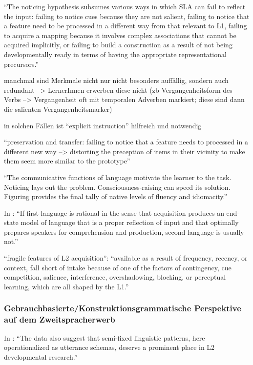         ``The noticing hypothesis subsumes various ways in which SLA can fail to reflect the input: failing to notice cues because they are not salient, failing to notice that a feature need to be processed in a different way from that relevant to L1, failing to acquire a mapping because it involves complex associations that cannot be acquired implicitly, or failing to build a construction as a result of not being developmentally ready in terms of having the appropriate representational precursors.''

        manchmal sind Merkmale nicht nur nicht besonders auffällig, sondern auch redundant --> LernerInnen erwerben diese nicht (zb Vergangenheitsform des Verbs --> Vergangenheit oft mit temporalen Adverben markiert; diese sind dann die salienten Vergangenheitsmarker)

        in solchen Fällen ist ``explicit instruction'' hilfreich und notwendig

        ``preservation and transfer: failing to notice that a feature needs to processed in a different new way --> distorting the preception of items in their vicinity to make them seem more similar to the prototype''

        ``The communicative functions of language motivate the learner to the task.
        Noticing lays out the problem.
        Consciousness-raising can speed its solution.
        Figuring provides the final tally of native levels of fluency and idiomacity.''

        In \cite{Ellis06}: ``If first language is rational in the sense that acquisition produces an
        end-state model of language that is a proper reflection of input and that
        optimally prepares speakers for comprehension and production, second
        language is usually not.''

        ``fragile features of L2 acquisition'': ``available as a
        result of frequency, recency, or context, fall short of intake because of one of the
        factors of contingency, cue competition, salience, interference, overshadowing,
        blocking, or perceptual learning, which are all shaped by the L1.''

\subsubsection{Gebrauchbasierte/Konstruktionsgrammatische Perspektive auf dem Zweitspracherwerb}

In \cite{Eskildsen08}: ``The data also suggest that semi-fixed linguistic
patterns, here operationalized as utterance schemas, deserve a prominent place
in L2 developmental research.''

